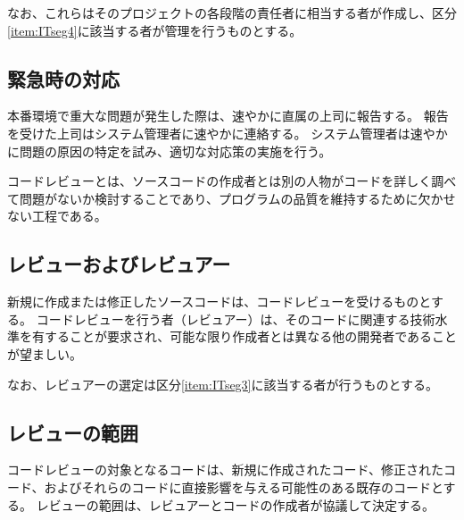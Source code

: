 なお、これらはそのプロジェクトの各段階の責任者に相当する者が作成し、区分\ref{item:ITseg4}\hx に該当する者が管理を行うものとする。

\subsection{緊急時の対応}
本番環境で重大な問題が発生した際は、速やかに直属の上司に報告する。
報告を受けた上司はシステム管理者に速やかに連絡する。
システム管理者は速やかに問題の原因の特定を試み、適切な対応策の実施を行う。



\clearpage
コードレビューとは、ソースコードの作成者とは別の人物がコードを詳しく調べて問題がないか検討することであり、プログラムの品質を維持するために欠かせない工程である。

\subsection{レビューおよびレビュアー}
新規に作成または修正したソースコードは、コードレビューを受けるものとする。
コードレビューを行う者（レビュアー）は、そのコードに関連する技術水準を有することが要求され、可能な限り作成者とは異なる他の開発者であることが望ましい。

なお、レビュアーの選定は区分\ref{item:ITseg3}\hx に該当する者が行うものとする。

\subsection{レビューの範囲}
コードレビューの対象となるコードは、新規に作成されたコード、修正されたコード、およびそれらのコードに直接影響を与える可能性のある既存のコードとする。
レビューの範囲は、レビュアーとコードの作成者が協議して決定する。


